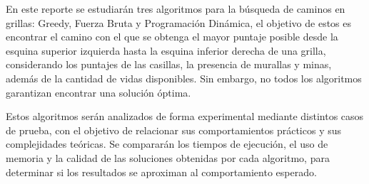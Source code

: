 En este reporte se estudiarán tres algoritmos para la búsqueda de caminos en grillas: Greedy, Fuerza Bruta y Programación Dinámica, el objetivo de estos es encontrar el camino con el que se obtenga el mayor puntaje posible desde la esquina superior izquierda hasta la esquina inferior derecha de una grilla, considerando los puntajes de las casillas, la presencia de murallas y minas, además de la cantidad de vidas disponibles. Sin embargo, no todos los algoritmos garantizan encontrar una solución óptima.

Estos algoritmos serán analizados de forma experimental mediante distintos casos de prueba, con el objetivo de relacionar sus comportamientos prácticos y sus complejidades teóricas. Se compararán los tiempos de ejecución, el uso de memoria y la calidad de las soluciones obtenidas por cada algoritmo, para determinar si los resultados se aproximan al comportamiento esperado.

